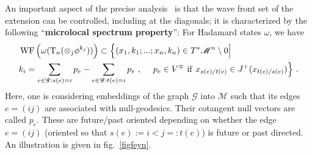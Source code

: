 \documentclass[12pt]{article}
\newcommand{\eG}{{\mathscr G}}
\newcommand{\M}{\mathscr{M}}
\newcommand{\T}{{\rm T}}
\DeclareMathOperator{\WF}{WF}
\theoremstyle{plain}
\theoremstyle{definition}
\def\ben{\begin{equation}}
\def\een{\end{equation}}
\begin{document}
An important aspect of the precise analysis~\cite{bf2,hw2} is that the wave front set of the extension can be controlled, including at the diagonals; it is characterized by the following ``{\bf microlocal
spectrum property}'': For Hadamard states $\omega$, we have 
\ben
\label{msc}
\begin{split}
& \WF\Big(\omega(\T_n( \otimes_j \phi^{k_j} )) \Big) \subset \Big\{ (x_1, k_1; ... ; x_n, k_n) \in T^* \M^n \setminus 0 \Big| \\
&  k_i = 
\sum_{e \in \eG: s(e) = i} p_e - \sum_{e \in \eG: t(e) = i} p_e \ ,  \ \ \ \ p_e \in V^\mp \ {\rm if} \ x_{s(e)/t(e)} \in J^+(x_{t(e)/s(e)}) \Big\} \ . 
\end{split}
\een
Here, one is considering embeddings of the graph $\eG$ into $\M$ such that its 
edges $e=(ij)$ are associated with null-geodesics. Their cotangent null vectors are called
$p_e$. These are future/past oriented depending on whether the edge $e=(ij)$ (oriented 
so that $s(e):=i<j=:t(e)$) is future or past directed. An illustration is given in 
fig.~\ref{figfeyn}. 
\end{document}
